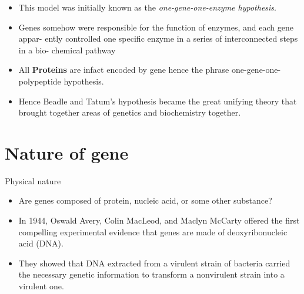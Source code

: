 \documentclass[11pt,dvipsnames,ignorenonframetext,aspectratio=169]{beamer}
\providecommand{\tightlist}{%
  \setlength{\itemsep}{0pt}\setlength{\parskip}{0pt}}
\begin{document}
\begin{frame}{}
\protect\hypertarget{section-9}{}

\begin{itemize}
\tightlist
\item
  This model was initially known as the \emph{one-gene-one-enzyme
  hypothesis}.
\item
  Genes somehow were responsible for the function of enzymes, and each
  gene appar- ently controlled one specific enzyme in a series of
  interconnected steps in a bio- chemical pathway
\item
  All \textbf{Proteins} are infact encoded by gene hence the phrase
  one-gene-one-polypeptide hypothesis.
\item
  Hence Beadle and Tatum's hypothesis became the great unifying theory
  that brought together areas of genetics and biochemistry together.
\end{itemize}

\end{frame}

\hypertarget{nature-of-gene}{%
\section{Nature of gene}\label{nature-of-gene}}

\begin{frame}{Physical nature}
\protect\hypertarget{physical-nature}{}

\begin{itemize}
\tightlist
\item
  Are genes composed of protein, nucleic acid, or some other substance?
\item
  In 1944, Oswald Avery, Colin MacLeod, and Maclyn McCarty offered the
  first compelling experimental evidence that genes are made of
  deoxyribonucleic acid (DNA).
\item
  They showed that DNA extracted from a virulent strain of bacteria
  carried the necessary genetic information to transform a nonvirulent
  strain into a virulent one.
\end{itemize}

\end{frame}
\end{document}
